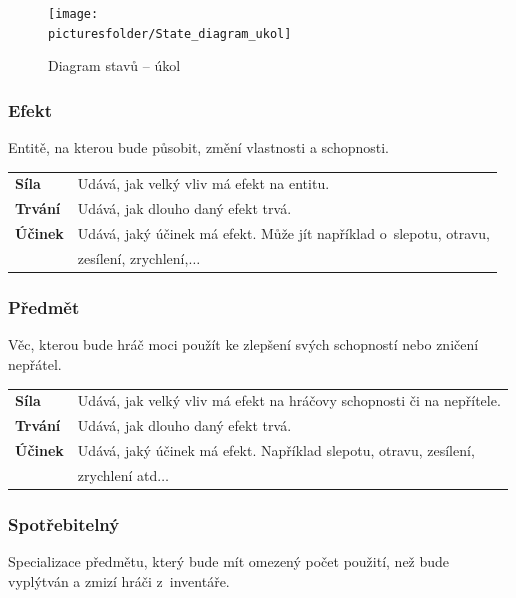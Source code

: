 \documentclass[12pt,a4paper]{article}
\def\picturesfolder{obrazky}
\begin{document}
\begin{figure}
\begin{center}
  \texttt{[image: \\picturesfolder/State\_diagram\_ukol]}
  \caption{Diagram stavů -- úkol}
  \label{stavy:ukol}
\end{center}
\end{figure}

\subsubsection{Efekt}
Entitě, na kterou bude působit, změní vlastnosti a schopnosti. \\[5pt]

\begin{tabular*}{0.87\textwidth}{ll}
\bf Síla & Udává, jak velký vliv má efekt na entitu.\\[7pt]
\bf Trvání & Udává, jak dlouho daný efekt trvá.\\[7pt]
\bf Účinek & Udává, jaký účinek má efekt. Může jít například o~slepotu, otravu,\\
           & zesílení, zrychlení,$\ldots$\\[7pt]
\end{tabular*}

\subsubsection{Předmět}
Věc, kterou bude hráč moci použít ke zlepšení svých schopností nebo zničení
nepřátel.\\[5pt]

\begin{tabular*}{0.87\textwidth}{ll}
  \bf Síla & Udává, jak velký vliv má efekt na hráčovy schopnosti či na
  nepřítele. \\[7pt]
  \bf Trvání & Udává, jak dlouho daný efekt trvá. \\[7pt]
  \bf Účinek & Udává, jaký účinek má efekt. Například slepotu, otravu, zesílení,\\
             & zrychlení atd$\ldots$ \\[7pt]
\end{tabular*}

\subsubsection{Spotřebitelný}
Specializace předmětu, který bude mít omezený počet použití, než bude vyplýtván
a zmizí hráči z~inventáře. \\[5pt]
\end{document}
